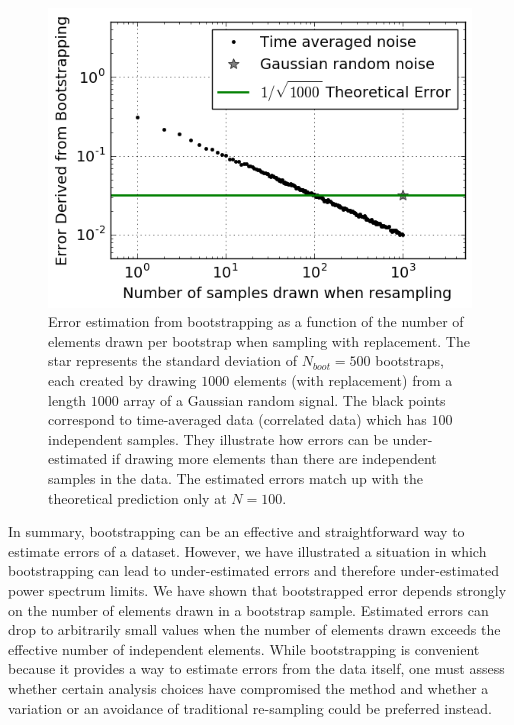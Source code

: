 \documentclass[preprint2,numberedappendix,tighten]{aastex6}  %
\begin{document}
\begin{figure}
	\centering
	\includegraphics[trim={0cm 0cm 0cm 0cm},width=\columnwidth]{plots/toy_error1.png}
	\caption{Error estimation from bootstrapping as a function of the number of elements drawn per bootstrap when 
sampling with replacement. The star represents the standard deviation of $N_{boot}=500$ bootstraps, each created by drawing $1000$ 
elements (with replacement) from a length $1000$ array of a Gaussian random signal. The black points correspond to time-averaged data (correlated data) which has $100$ independent samples. They illustrate how errors can be under-estimated if 
drawing more elements than there are independent samples in the data. The estimated errors match up with the theoretical 
prediction only at $N=100$.}
	\label{fig:toy_error1}
\end{figure}

In summary, bootstrapping can be an effective and straightforward way to estimate errors of a dataset. However, we have 
illustrated a situation in which bootstrapping can lead to under-estimated errors and therefore under-estimated power spectrum limits. We have shown that 
bootstrapped error depends strongly on the number of elements drawn in a bootstrap sample. Estimated errors can drop to 
arbitrarily small values when the number of elements drawn exceeds the effective number of independent elements. 
While bootstrapping is convenient because it provides a way to estimate errors from the data itself, one must assess whether certain 
analysis choices have compromised the method and whether a variation or an avoidance of traditional re-sampling could be preferred instead.
\end{document}
